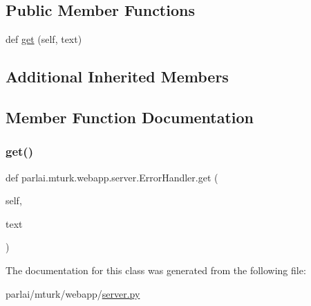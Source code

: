 \subsection*{Public Member Functions}
\begin{DoxyCompactItemize}
\item 
def \hyperlink{classparlai_1_1mturk_1_1webapp_1_1server_1_1ErrorHandler_ac3b2ba04b0b32eb33f67f7637508a4d6}{get} (self, text)
\end{DoxyCompactItemize}
\subsection*{Additional Inherited Members}


\subsection{Member Function Documentation}
\mbox{\label{classparlai_1_1mturk_1_1webapp_1_1server_1_1ErrorHandler_ac3b2ba04b0b32eb33f67f7637508a4d6}} 
\subsubsection{\texorpdfstring{get()}{get()}}
{\footnotesize\ttfamily def parlai.\+mturk.\+webapp.\+server.\+Error\+Handler.\+get (\begin{DoxyParamCaption}\item[{}]{self,  }\item[{}]{text }\end{DoxyParamCaption})}



The documentation for this class was generated from the following file\+:\begin{DoxyCompactItemize}
\item 
parlai/mturk/webapp/\hyperlink{server_8py}{server.\+py}\end{DoxyCompactItemize}
